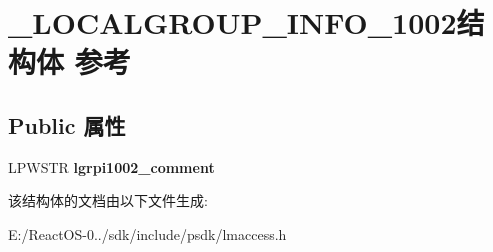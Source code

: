 \hypertarget{struct___l_o_c_a_l_g_r_o_u_p___i_n_f_o__1002}{}\section{\+\_\+\+L\+O\+C\+A\+L\+G\+R\+O\+U\+P\+\_\+\+I\+N\+F\+O\+\_\+1002结构体 参考}
\label{struct___l_o_c_a_l_g_r_o_u_p___i_n_f_o__1002}
\subsection*{Public 属性}
\begin{DoxyCompactItemize}
\item 
\mbox{\label{struct___l_o_c_a_l_g_r_o_u_p___i_n_f_o__1002_a6e6873fc452a3b0d9abc9ac7f2832d5c}} 
L\+P\+W\+S\+TR {\bfseries lgrpi1002\+\_\+comment}
\end{DoxyCompactItemize}


该结构体的文档由以下文件生成\+:\begin{DoxyCompactItemize}
\item 
E\+:/\+React\+O\+S-\/0../sdk/include/psdk/lmaccess.\+h\end{DoxyCompactItemize}
